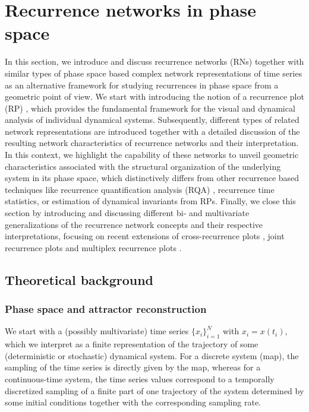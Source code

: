 \section{Recurrence networks in phase space} \label{sec:RecurrenceNt}
In this section, we introduce and discuss recurrence networks (RNs) together with similar types of phase space based complex network representations of time series as an alternative framework for studying recurrences in phase space from a geometric point of view. We start with introducing the notion of a recurrence plot (RP) \cite{Eckmann1987,marwan2007}, which provides the fundamental framework for the visual and dynamical analysis of individual dynamical systems. Subsequently, different types of related network representations are introduced together with a detailed discussion of the resulting network characteristics of recurrence networks and their interpretation. In this context, we highlight the capability of these networks to unveil geometric characteristics associated with the structural organization of the underlying system in its phase space, which distinctively differs from other recurrence based techniques like recurrence quantification analysis (RQA) \cite{zbilut92,trulla96}, recurrence time statistics, or estimation of dynamical invariants from RPs. Finally, we close this section by introducing and discussing different bi- and multivariate generalizations of the recurrence network concepts and their respective interpretations, focusing on recent extensions of cross-recurrence plots \cite{marwan2002,Zbilut1998}, joint recurrence plots \cite{romano2004} and multiplex recurrence plots \cite{Eroglu2018}.


	\subsection{Theoretical background}
		\subsubsection{Phase space and attractor reconstruction} \label{sec:attractorReconstruct}
		We start with a (possibly multivariate) time series $\{x_i\}_{i=1}^N$ with $x_i=x(t_i)$, which we interpret as a finite representation of the trajectory of some (deterministic or stochastic) dynamical system. For a discrete system (map), the sampling of the time series is directly given by the map, whereas for a continuous-time system, the time series values correspond to a temporally discretized sampling of a finite part of one trajectory of the system determined by some initial conditions together with the corresponding sampling rate.

